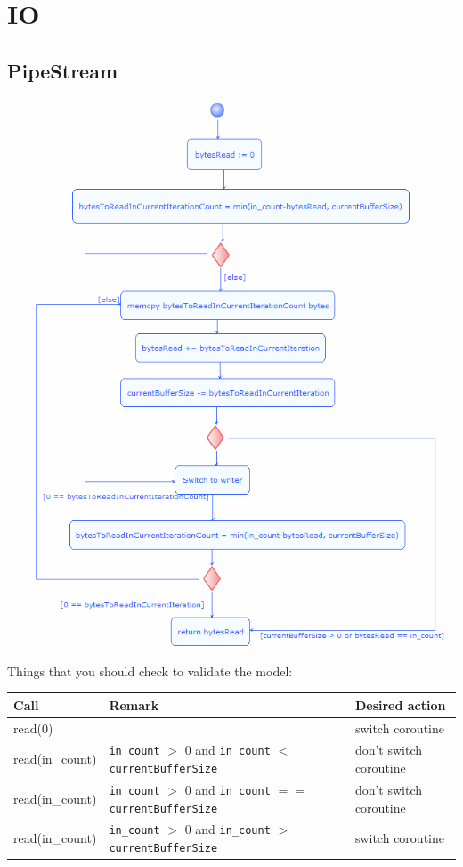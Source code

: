 \documentclass[10pt]{scrbook}
\begin{document}
\section{IO}

\subsection{PipeStream}

\includegraphics[width=130mm]{uml/PipeStream_read_activity.png}

Things that you should check to validate the model:

\begin{tabular}{| l | l | l |}
\hline
Call & Remark & Desired action \\
\hline
\hline
  read(0) & & switch coroutine \\
\hline
  read(in\_count) & \texttt{in\_count} $>$ 0 and \texttt{in\_count} $<$ \texttt{currentBufferSize} & don't switch coroutine \\
\hline
  read(in\_count) & \texttt{in\_count} $>$ 0 and \texttt{in\_count} $==$ \texttt{currentBufferSize} & don't switch coroutine \\
\hline
  read(in\_count) & \texttt{in\_count} $>$ 0 and \texttt{in\_count} $>$ \texttt{currentBufferSize} & switch coroutine \\
\hline
\end{tabular}
\end{document}
